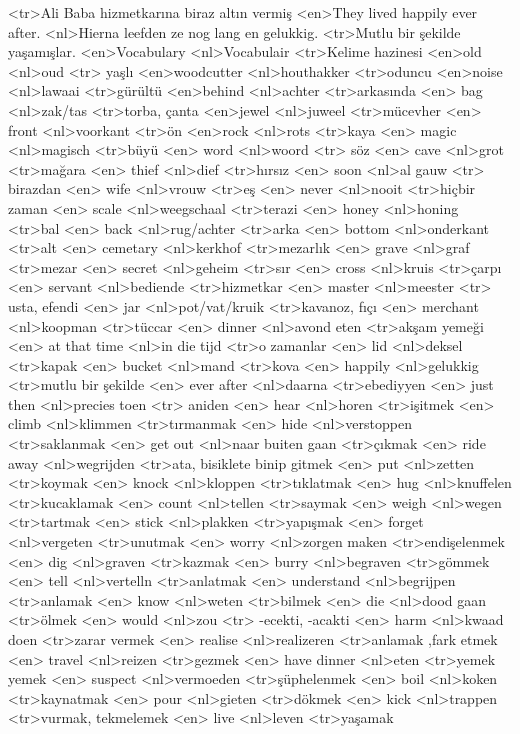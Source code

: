 <tr>Ali Baba hizmetkarına biraz altın vermiş
<en>They lived happily ever after.
<nl>Hierna leefden ze nog lang en gelukkig. 
<tr>Mutlu bir şekilde yaşamışlar.
<en>Vocabulary
<nl>Vocabulair
<tr>Kelime hazinesi
<en>old
<nl>oud 
<tr> yaşlı
<en>woodcutter
<nl>houthakker 
<tr>oduncu
<en>noise 
<nl>lawaai
<tr>gürültü
<en>behind 
<nl>achter 
<tr>arkasında
<en> bag 
<nl>zak/tas 
<tr>torba, çanta
<en>jewel 
<nl>juweel 
<tr>mücevher
<en> front 
<nl>voorkant 
<tr>ön
<en>rock 
<nl>rots 
<tr>kaya
<en> magic 
<nl>magisch 
<tr>büyü
<en> word 
<nl>woord 
<tr> söz
<en> cave 
<nl>grot 
<tr>mağara
<en> thief 
<nl>dief 
<tr>hırsız
<en> soon 
<nl>al gauw 
<tr> birazdan
<en> wife 
<nl>vrouw 
<tr>eş
<en> never 
<nl>nooit 
<tr>hiçbir zaman
<en> scale 
<nl>weegschaal 
<tr>terazi
<en> honey 
<nl>honing 
<tr>bal
<en> back 
<nl>rug/achter 
<tr>arka
<en> bottom 
<nl>onderkant 
<tr>alt
<en> cemetary 
<nl>kerkhof 
<tr>mezarlık
<en> grave 
<nl>graf 
<tr>mezar
<en> secret 
<nl>geheim 
<tr>sır
<en> cross 
<nl>kruis 
<tr>çarpı
<en> servant 
<nl>bediende 
<tr>hizmetkar
<en> master 
<nl>meester 
<tr> usta, efendi
<en> jar 
<nl>pot/vat/kruik 
<tr>kavanoz, fıçı
<en> merchant 
<nl>koopman 
<tr>tüccar
<en> dinner 
<nl>avond eten 
<tr>akşam yemeği
<en> at that time 
<nl>in die tijd  
<tr>o zamanlar 
<en> lid 
<nl>deksel 
<tr>kapak
<en> bucket 
<nl>mand 
<tr>kova
<en> happily 
<nl>gelukkig 
<tr>mutlu bir şekilde
<en> ever after 
<nl>daarna 
<tr>ebediyyen
<en> just then 
<nl>precies toen 
<tr> aniden
<en> hear 
<nl>horen 
<tr>işitmek
<en> climb 
<nl>klimmen 
<tr>tırmanmak
<en> hide 
<nl>verstoppen 
<tr>saklanmak
<en> get out 
<nl>naar buiten gaan 
<tr>çıkmak 
<en> ride away 
<nl>wegrijden 
<tr>ata, bisiklete binip gitmek
<en> put 
<nl>zetten 
<tr>koymak
<en> knock 
<nl>kloppen 
<tr>tıklatmak
<en> hug 
<nl>knuffelen 
<tr>kucaklamak
<en> count 
<nl>tellen 
<tr>saymak
<en> weigh 
<nl>wegen 
<tr>tartmak
<en> stick 
<nl>plakken 
<tr>yapışmak
<en> forget 
<nl>vergeten 
<tr>unutmak
<en> worry 
<nl>zorgen maken 
<tr>endişelenmek
<en> dig 
<nl>graven 
<tr>kazmak
<en> burry 
<nl>begraven 
<tr>gömmek
<en> tell 
<nl>vertelln 
<tr>anlatmak
<en> understand 
<nl>begrijpen 
<tr>anlamak
<en> know 
<nl>weten 
<tr>bilmek
<en> die 
<nl>dood gaan 
<tr>ölmek
<en> would 
<nl>zou 
<tr> -ecekti, -acakti
<en> harm 
<nl>kwaad doen 
<tr>zarar vermek
<en> realise 
<nl>realizeren 
<tr>anlamak ,fark etmek
<en> travel 
<nl>reizen 
<tr>gezmek
<en> have dinner 
<nl>eten 
<tr>yemek yemek
<en> suspect 
<nl>vermoeden 
<tr>şüphelenmek
<en> boil 
<nl>koken 
<tr>kaynatmak
<en> pour 
<nl>gieten 
<tr>dökmek
<en> kick 
<nl>trappen 
<tr>vurmak, tekmelemek
<en> live 
<nl>leven 
<tr>yaşamak

